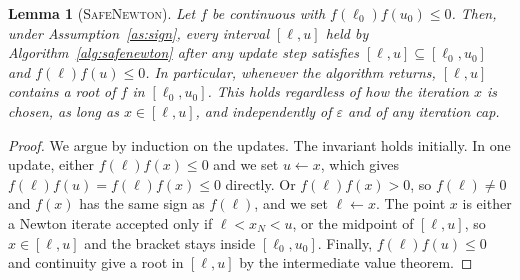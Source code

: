 \documentclass[final,5p,times,twocolumn]{elsarticle}
\newtheorem{lemma}{Lemma}
\theoremstyle{definition}
\begin{document}
\begin{lemma}[\textsc{SafeNewton}]\label{lem:newton}
Let $f$ be continuous with $f(\ell_0)f(u_0)\le0$. Then, under Assumption~\ref{as:sign}, every interval $[\ell,u]$ held by Algorithm~\ref{alg:safenewton} after any update step satisfies $[\ell,u]\subseteq[\ell_0,u_0]$ and $f(\ell)f(u)\le0$. In particular, whenever the algorithm returns, $[\ell,u]$ contains a root of $f$ in $[\ell_0,u_0]$. This holds regardless of how the iteration $x$ is chosen, as long as $x\in[\ell,u]$, and independently of $\varepsilon$ and of any iteration cap.
\end{lemma}
\begin{proof}
We argue by induction on the updates. The invariant holds initially. In one update, either $f(\ell)f(x)\le0$ and we set $u\gets x$, which gives $f(\ell)f(u)=f(\ell)f(x)\le0$ directly. Or $f(\ell)f(x)>0$, so $f(\ell)\ne0$ and $f(x)$ has the same sign as $f(\ell)$, and we set $\ell\gets x$. The point $x$ is either a Newton iterate accepted only if $\ell<x_N<u$, or the midpoint of $[\ell,u]$, so $x\in[\ell,u]$ and the bracket stays inside $[\ell_0,u_0]$. Finally, $f(\ell)f(u)\le0$ and continuity give a root in $[\ell,u]$ by the intermediate value theorem.
\end{proof}
\end{document}
